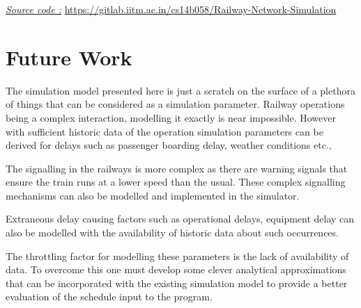 \documentclass[twoside,11pt]{article}
\begin{document}
\noindent \underline{\em Source code :}  \url{https://gitlab.iitm.ac.in/cs14b058/Railway-Network-Simulation} 

\section{Future Work}

The simulation model presented here is just a scratch on the surface of a plethora of things that can be considered as a simulation parameter. Railway operations being a complex interaction, modelling it exactly is near impossible. However with sufficient historic data of the operation simulation parameters can be derived for delays such as passenger boarding delay, weather conditions etc.,

\noindent The signalling in the railways is more complex as there are warning signals that ensure the train runs at a lower speed than the usual. These complex signalling mechanisms can also be modelled and implemented in the simulator.

\noindent Extraneous delay causing factors such as operational delays, equipment delay can also be modelled with the availability of historic data about such occurrences.

\noindent The throttling factor for modelling these parameters is the lack of availability of data. To overcome this one must develop some clever analytical approximations that can be incorporated with the existing simulation model to provide a better evaluation of the schedule input to the program.



\nocite{SignallingTypes}
\nocite{SignallingImgs}
\nocite{DelayInTrains}
\nocite{7313186}
\vskip 0.2in



\end{document}
